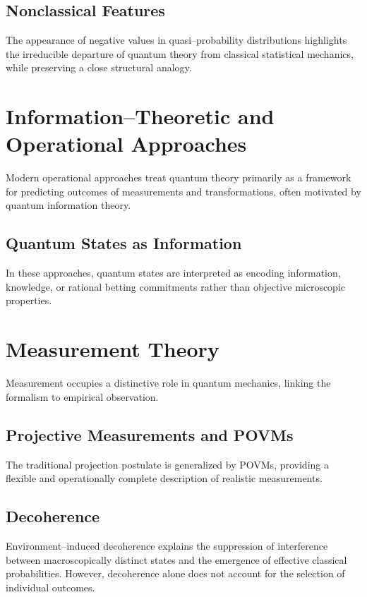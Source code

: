 \documentclass[11pt]{article}
\begin{document}
\subsection{Nonclassical Features}

The appearance of negative values in quasi--probability distributions highlights the irreducible departure of quantum theory from classical statistical mechanics, while preserving a close structural analogy.

\section{Information--Theoretic and Operational Approaches}

Modern operational approaches treat quantum theory primarily as a framework for predicting outcomes of measurements and transformations, often motivated by quantum information theory.

\subsection{Quantum States as Information}

In these approaches, quantum states are interpreted as encoding information, knowledge, or rational betting commitments rather than objective microscopic properties.

\section{Measurement Theory}

Measurement occupies a distinctive role in quantum mechanics, linking the formalism to empirical observation.

\subsection{Projective Measurements and POVMs}

The traditional projection postulate is generalized by POVMs, providing a flexible and operationally complete description of realistic measurements.

\subsection{Decoherence}

Environment--induced decoherence explains the suppression of interference between macroscopically distinct states and the emergence of effective classical probabilities. However, decoherence alone does not account for the selection of individual outcomes.
\end{document}
